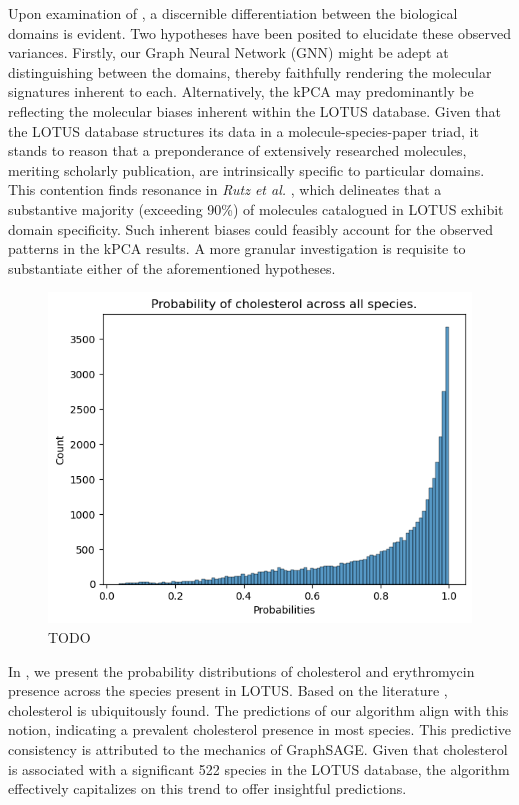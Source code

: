 \documentclass[
11pt, %
oneside, %
english, %
singlespacing, %
headsepline, %
chapterinoneline, %
]{MastersDoctoralThesis} %
\begin{document}
Upon examination of , a discernible differentiation between the biological domains is evident. Two hypotheses have been posited to elucidate these observed variances. Firstly, our Graph Neural Network (GNN) might be adept at distinguishing between the domains, thereby faithfully rendering the molecular signatures inherent to each. Alternatively, the kPCA may predominantly be reflecting the molecular biases inherent within the LOTUS database. Given that the LOTUS database structures its data in a molecule-species-paper triad, it stands to reason that a preponderance of extensively researched molecules, meriting scholarly publication, are intrinsically specific to particular domains. This contention finds resonance in \textit{Rutz et al.} \cite{rutzLOTUSInitiativeOpen2022}, which delineates that a substantive majority (exceeding 90\%) of molecules catalogued in LOTUS exhibit domain specificity. Such inherent biases could feasibly account for the observed patterns in the kPCA results. A more granular investigation is requisite to substantiate either of the aforementioned hypotheses.
 
\begin{figure}[h]
	\centering
	\includegraphics[scale=0.7]{figure/cholesterol_plot}
	\caption{TODO}
	\label{fig: hist cholesterol}
\end{figure}

In , we present the probability distributions of cholesterol and erythromycin presence across the species present in LOTUS. Based on the literature \cite{o2013merck, international1987iarc}, cholesterol is ubiquitously found. The predictions of our algorithm align with this notion, indicating a prevalent cholesterol presence in most species. This predictive consistency is attributed to the mechanics of GraphSAGE. Given that cholesterol is associated with a significant 522 species in the LOTUS database, the algorithm effectively capitalizes on this trend to offer insightful predictions.
\end{document}
